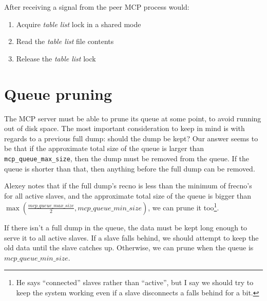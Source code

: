 \documentclass{article}
\newcommand{\tablist}{\emph{table list}}
\begin{document}
After receiving a signal from the peer MCP process would:

\begin{enumerate}

\item Acquire \tablist{} lock in a shared mode
\item Read the \tablist{} file contents
\item Release the \tablist{} lock

\end{enumerate}

\section{Queue pruning}

The MCP server must be able to prune its queue at some point,
to avoid running out of disk space.
The most important consideration to keep in mind is with regards
to a previous full dump: should the dump be kept?
Our answer seems to be that if the approximate total size of the queue
is larger than \verb|mcp_queue_max_size|,
then the dump must be removed from the queue.
If the queue is shorter than that,
then anything before the full dump can be removed.

Alexey notes that if the full dump's recno is less than
the minimum of frecno's for all active slaves,
and the approximate total size of the queue is bigger than
$ \max(\frac{mcp\_queue\_max\_size}{2}, mcp\_queue\_min\_size) $,
we can prune it too\footnote{He says ``connected'' slaves
rather than ``active'',
but I say we should try to keep the system working
even if a slave disconnects a falls behind for a bit.}.

If there isn't a full dump in the queue,
the data must be kept long enough to serve it to all active slaves.
If a slave falls behind,
we should attempt to keep the old data
until the slave catches up.
Otherwise,
we can prune when the queue is $ mcp\_queue\_min\_size $.
\end{document}
